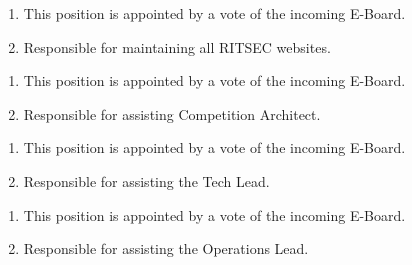 


\begin{enumerate}
  \item This position is appointed by a vote of the incoming E-Board. 
  \item Responsible for maintaining all RITSEC websites.
\end{enumerate}


\begin{enumerate}
  \item This position is appointed by a vote of the incoming E-Board.
  \item Responsible for assisting Competition Architect.
\end{enumerate}


\begin{enumerate}
  \item This position is appointed by a vote of the incoming E-Board.
  \item Responsible for assisting the Tech Lead.
\end{enumerate}


\begin{enumerate}
  \item This position is appointed by a vote of the incoming E-Board.
  \item Responsible for assisting the Operations Lead.
\end{enumerate}